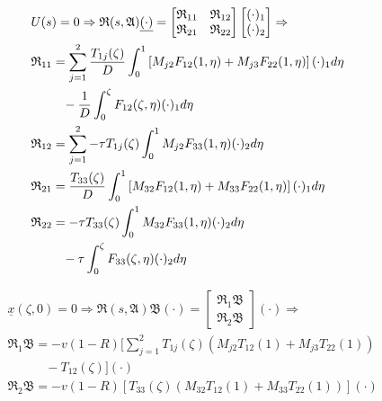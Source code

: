     \begin{equation} \label{eq:2_resolvent_x}
    \begin{aligned}
        &U(s) = 0 \Rightarrow \mathfrak{R}(s, \mathfrak{A}) \underline{(\cdot)} = \begin{bmatrix}
            \mathfrak{R}_{11} & \mathfrak{R}_{12}\\
            \mathfrak{R}_{21} & \mathfrak{R}_{22}
        \end{bmatrix} \begin{bmatrix}
            (\cdot)_1\\ (\cdot)_2
        \end{bmatrix} \Rightarrow\\
        &\mathfrak{R}_{11} = \sum_{j=1}^2 \frac{T_{1j}(\zeta)}{D} \int_0^1 \left[ M_{j2} F_{12}(1,\eta) + M_{j3} F_{22}(1,\eta) \right] (\cdot)_1 d\eta\\
        &\hspace{2.5em} -\frac{1}{D} \int_0^{\zeta} F_{12}(\zeta, \eta) (\cdot)_1 d\eta\\
        &\mathfrak{R}_{12} = \sum_{j=1}^2 -\tau T_{1j}(\zeta) \int_0^1 M_{j2} F_{33}(1,\eta) (\cdot)_2 d\eta\\
        &\mathfrak{R}_{21} = \frac{T_{33}(\zeta)}{D} \int_0^1 \left[ M_{32} F_{12}(1,\eta) + M_{33} F_{22}(1,\eta) \right] (\cdot)_1 d\eta\\
        &\mathfrak{R}_{22} = -\tau T_{33}(\zeta) \int_0^1 M_{32} F_{33}(1,\eta) (\cdot)_2 d\eta\\
        &\hspace{2.5em} -\tau \int_0^{\zeta} F_{33}(\zeta, \eta) (\cdot)_2 d\eta
    \end{aligned}
    \end{equation}
    
    \begin{equation} \label{eq:2_resolvent_u}
    \begin{aligned}
        &\underline{x}(\zeta,0) = 0 \Rightarrow \mathfrak{R}(s, \mathfrak{A}) \mathfrak{B} (\cdot) = \begin{bmatrix}
            \mathfrak{R}_{1} \mathfrak{B}\\
            \mathfrak{R}_{2} \mathfrak{B}
        \end{bmatrix} (\cdot) \Rightarrow\\
        &\mathfrak{R}_{1} \mathfrak{B} = -v(1-R) \bigl[ \sum_{j=1}^{2} T_{1j}(\zeta) (M_{j2} T_{12}(1) + M_{j3} T_{22}(1)) \\
        &\hspace{3em} - T_{12}(\zeta) \bigr] (\cdot)\\
        &\mathfrak{R}_{2} \mathfrak{B} = -v(1-R) \left[ T_{33}(\zeta) (M_{32} T_{12}(1) + M_{33} T_{22}(1)) \right] (\cdot)
    \end{aligned}
    \end{equation}

